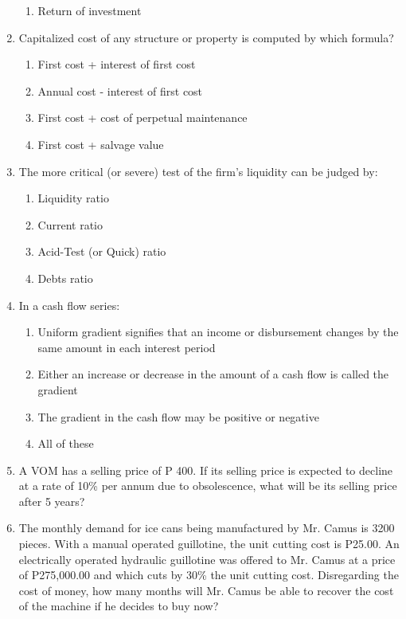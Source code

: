 \documentclass[11pt,a4paper]{article}
\begin{document}
\begin{enumerate}
\begin{enumerate}[label=\Alph*.]
\item{Return of investment}
\end{enumerate}
\item{Capitalized cost of any structure or property is computed by which formula?}
\begin{enumerate}[label=\Alph*.]
\item{First cost + interest of first cost}
\item{Annual cost - interest of first cost}
\item{First cost + cost of perpetual maintenance}
\item{First cost + salvage value}
\end{enumerate}
\item{The more critical (or severe) test of the firm's liquidity can be judged by:}
\begin{enumerate}[label=\Alph*.]
\item{Liquidity ratio}
\item{Current ratio}
\item{Acid-Test (or Quick) ratio}
\item{Debts ratio}
\end{enumerate}
\item{In a cash flow series:}
\begin{enumerate}[label=\Alph*.]
\item{Uniform gradient signifies that an income or disbursement changes by the same amount in each interest period}
\item{Either an increase or decrease in the amount of a cash flow is called the gradient}
\item{The gradient in the cash flow may be positive or negative}
\item{All of these}
\end{enumerate}
\item{A VOM has a selling price of P 400. If its selling price is expected to decline at a rate of 10\% per annum due to obsolescence, what will be its selling price after 5 years?}
\\
\item{The monthly demand for ice cans being manufactured by Mr. Camus is 3200 pieces. With a manual operated guillotine, the unit cutting cost is P25.00. An electrically operated hydraulic guillotine was offered to Mr. Camus at a price of P275,000.00 and which cuts by 30\% the unit cutting cost. Disregarding the cost of money, how many months will Mr. Camus be able to recover the cost of the machine if he decides to buy now?}

\end{enumerate}
\end{document}
